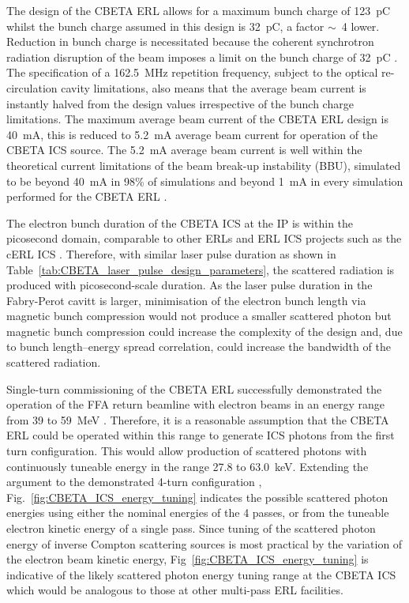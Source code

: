 \documentclass[../main.tex]{subfiles}
\begin{document}
The design of the CBETA ERL \cite{hoffstaetter2017cbeta} allows for a maximum bunch charge of 123~\si{\pico\coulomb} whilst the bunch charge assumed in this design is 32~\si{\pico\coulomb}, a factor $\sim$~4 lower. Reduction in bunch charge is necessitated because the coherent synchrotron radiation disruption of the beam imposes a limit on the bunch charge of 32~\si{\pico\coulomb} \cite{lou2020coherent}. The specification of a 162.5~\si{\mega\hertz} repetition frequency, subject to the optical re-circulation cavity limitations, also means that the average beam current is instantly halved from the design values irrespective of the bunch charge limitations. The maximum average beam current of the CBETA ERL design is 40~\si{\milli\ampere}, this is reduced to 5.2~\si{\milli\ampere} average beam current for operation of the CBETA ICS source. The 5.2~\si{\milli\ampere} average beam current is well within the theoretical current limitations of the beam break-up instability (BBU), simulated to be beyond 40~\si{\milli\ampere} in 98\% of simulations and beyond 1~\si{\milli\ampere} in every simulation performed for the CBETA ERL \cite{lou2019beam}.   

The electron bunch duration of the CBETA ICS at the IP is within the picosecond domain, comparable to other ERLs \cite{angal2018perle} and ERL ICS projects such as the cERL ICS \cite{akagi2016narrow}. Therefore, with similar laser pulse duration as shown in Table~\ref{tab:CBETA_laser_pulse_design_parameters}, the scattered radiation is produced with picosecond-scale duration. As the laser pulse duration in the Fabry-Perot cavitt is larger, minimisation of the electron bunch length via magnetic bunch compression would not produce a smaller scattered photon but magnetic bunch compression could increase the complexity of the design and, due to bunch length--energy spread correlation, could increase the bandwidth of the scattered radiation.   

Single-turn commissioning of the CBETA ERL successfully demonstrated the operation of the FFA return beamline with electron beams in an energy range from 39 to 59~\si{\mega\electronvolt} \cite{gulliford2019beam,gulliford2021measurement}. Therefore, it is a reasonable assumption that the CBETA ERL could be operated within this range to generate ICS photons from the first turn configuration. This would allow production of scattered photons with continuously tuneable energy in the range 27.8 to 63.0~\si{\kilo\electronvolt}. Extending the argument to the demonstrated 4-turn configuration \cite{bartnik2020cbeta}, Fig.~\ref{fig:CBETA_ICS_energy_tuning} indicates the possible scattered photon energies using either the nominal energies of the 4 passes, or from the tuneable electron kinetic energy of a single pass. Since tuning of the scattered photon energy of inverse Compton scattering sources is most practical by the variation of the electron beam kinetic energy, Fig~\ref{fig:CBETA_ICS_energy_tuning} is indicative of the likely scattered photon energy tuning range at the CBETA ICS which would be analogous to those at other multi-pass ERL facilities.  
\end{document}
